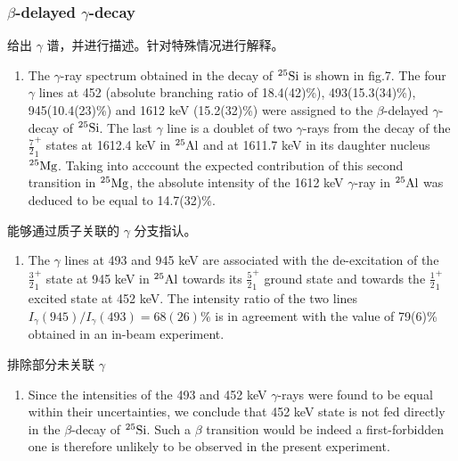 \documentclass[a4paper]{article}
\begin{document}
\subsubsection{$\beta$-delayed $\gamma$-decay}
给出 $\gamma$ 谱，并进行描述。针对特殊情况进行解释。
\begin{enumerate}
    \item The $\gamma$-ray spectrum obtained in the decay of $^{25}\textnormal{Si}$ is shown in fig.7. The four $\gamma$ lines at 452 (absolute branching ratio of 18.4(42)\%), 493(15.3(34)\%), 945(10.4(23)\%) and 1612 keV (15.2(32)\%) were assigned to the $\beta$-delayed $\gamma$-decay of $^{25}\textnormal{Si}$. The last $\gamma$ line is a doublet of two $\gamma$-rays from the decay of the $\frac{7}{2}_{1}^{+}$ states at 1612.4 keV in $^{25}\textnormal{Al}$ and at 1611.7 keV in its daughter nucleus $^{25}\textnormal{Mg}$. Taking into acccount the expected contribution of this second transition in $^{25}\textnormal{Mg}$, the absolute intensity of the 1612 keV $\gamma$-ray in $^{25}\textnormal{Al}$ was deduced to be equal to 14.7(32)\%.
\end{enumerate}

能够通过质子关联的 $\gamma$ 分支指认。
\begin{enumerate}
    \item The $\gamma$ lines at 493 and 945 keV are associated with the de-excitation of the $\frac{3}{2}_{1}^{+}$ state at 945 keV in $^{25}\textnormal{Al}$ towards its $\frac{5}{2}_{1}^{+}$ ground state and towards the $\frac{1}{2}_{1}^{+}$ excited state at 452 keV. The intensity ratio of the two lines $I_{\gamma}(945)/I_{\gamma }(493)=68(26)\%$ is in agreement with the value of 79(6)\% obtained in an in-beam experiment.
\end{enumerate}

排除部分未关联 $\gamma$
\begin{enumerate}
    \item Since the intensities of the 493 and 452 keV $\gamma$-rays were found to be equal within their uncertainties, we conclude that 452 keV state is not fed directly in the $\beta$-decay of $^{25}\textnormal{Si}$. Such a $\beta$ transition would be indeed a first-forbidden one is therefore unlikely to be observed in the present experiment.
\end{enumerate}
\end{document}
